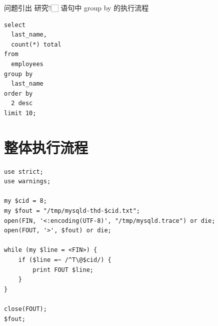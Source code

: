 \documentclass[presentation]{beamer}
\begin{document}
\begin{frame}[label={sec:org629dfda},fragile]{问题引出}
 研究👇🏻 语句中 group by 的执行流程
\begin{verbatim}
select
  last_name,
  count(*) total
from
  employees
group by
  last_name
order by
  2 desc
limit 10;
\end{verbatim}
\end{frame}

\section{整体执行流程}
\label{sec:org8ed9be6}
\begin{verbatim}
use strict;
use warnings;

my $cid = 8;
my $fout = "/tmp/mysqld-thd-$cid.txt";
open(FIN, '<:encoding(UTF-8)', "/tmp/mysqld.trace") or die;
open(FOUT, '>', $fout) or die;

while (my $line = <FIN>) {
    if ($line =~ /^T\@$cid/) {
        print FOUT $line;
    }
}

close(FOUT);
$fout;
\end{verbatim}
\end{document}
